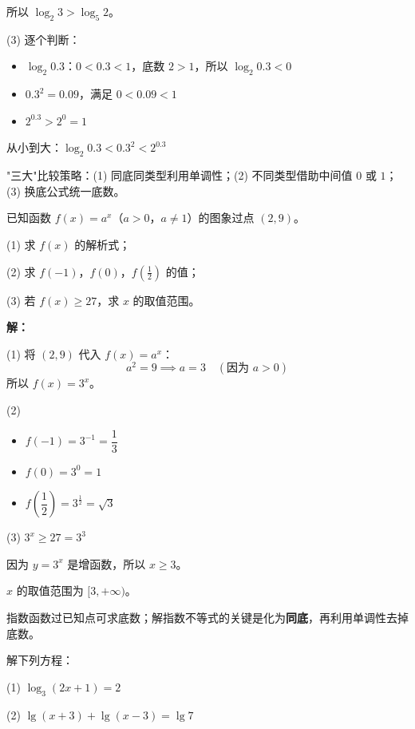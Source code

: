 \documentclass[12pt, a4paper]{ctexart}
\begin{document}
所以 $\log_2 3 > \log_5 2$。

(3) 逐个判断：
\begin{itemize}[leftmargin=2em]
  \item $\log_2 0.3$：$0<0.3<1$，底数 $2>1$，所以 $\log_2 0.3 < 0$
  \item $0.3^2 = 0.09$，满足 $0 < 0.09 < 1$
  \item $2^{0.3} > 2^0 = 1$
\end{itemize}

从小到大：$\log_2 0.3 < 0.3^2 < 2^{0.3}$

\begin{tipbox}[方法总结]
"三大"比较策略：(1) 同底同类型利用单调性；(2) 不同类型借助中间值 $0$ 或 $1$；(3) 换底公式统一底数。
\end{tipbox}

\begin{examplebox}[【例8】指数函数与对数函数的综合]
已知函数 $f(x) = a^x$（$a>0$，$a\neq 1$）的图象过点 $(2, 9)$。

(1) 求 $f(x)$ 的解析式；

(2) 求 $f(-1)$，$f(0)$，$f\!\left(\frac{1}{2}\right)$ 的值；

(3) 若 $f(x) \geq 27$，求 $x$ 的取值范围。
\end{examplebox}

\textbf{解：}

(1) 将 $(2,9)$ 代入 $f(x)=a^x$：
\[
a^2 = 9 \implies a = 3 \quad (\text{因为 } a>0)
\]
所以 $f(x) = 3^x$。

(2)
\begin{itemize}[leftmargin=2em]
  \item $f(-1) = 3^{-1} = \dfrac{1}{3}$
  \item $f(0) = 3^0 = 1$
  \item $f\!\left(\dfrac{1}{2}\right) = 3^{\frac{1}{2}} = \sqrt{3}$
\end{itemize}

(3) $3^x \geq 27 = 3^3$

因为 $y=3^x$ 是增函数，所以 $x \geq 3$。

$x$ 的取值范围为 $[3, +\infty)$。

\begin{tipbox}[方法总结]
指数函数过已知点可求底数；解指数不等式的关键是化为\textbf{同底}，再利用单调性去掉底数。
\end{tipbox}

\begin{examplebox}[【例9】对数方程]
解下列方程：
\par (1) $\log_3(2x+1) = 2$
\par (2) $\lg(x+3) + \lg(x-3) = \lg 7$
\end{examplebox}
\end{document}
